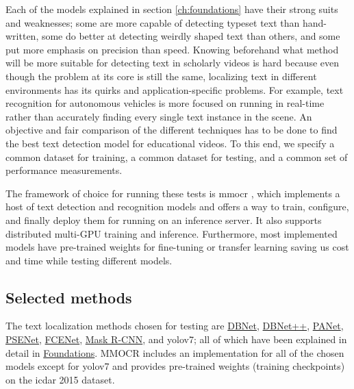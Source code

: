 Each of the models explained in section \ref{ch:foundations} have their strong suits and weaknesses; some are more capable of detecting typeset text than hand-written, some do better at detecting weirdly shaped text than others, and some put more emphasis on precision than speed. Knowing beforehand what method will be more suitable for detecting text in scholarly videos is hard because even though the problem at its core is still the same, localizing text in different environments has its quirks and application-specific problems. For example, text recognition for autonomous vehicles is more focused on running in real-time rather than accurately finding every single text instance in the scene. An objective and fair comparison of the different techniques has to be done to find the best text detection model for educational videos. To this end, we specify a common dataset for training, a common dataset for testing, and a common set of performance measurements.

The framework of choice for running these tests is \gls{mmocr} \cite{mmocr_contributors_openmmlab_2020}, which implements a host of text detection and recognition models and offers a way to train, configure,  and finally deploy them for running on an inference server. It also supports distributed multi-GPU training and inference. Furthermore, most implemented models have pre-trained weights for fine-tuning or transfer learning saving us cost and time while testing different models.

\subsection{Selected methods}

The text localization methods chosen for testing are \hyperref[dbnet]{DBNet}, \hyperref[dbnetpp]{DBNet++}, \hyperref[panet]{PANet}, \hyperref[psenet]{PSENet}, \hyperref[fcenet]{FCENet}, \hyperref[maskrcnn]{Mask R-CNN}, and \gls{yolov7}; all of which have been explained in detail in \hyperref[ch:foundations]{Foundations}. MMOCR includes an implementation for all of the chosen models except for \gls{yolov7} and provides pre-trained weights (training checkpoints) on the \gls{icdar} 2015 \cite{karatzas_icdar_2015} dataset.

